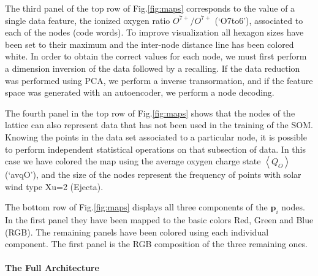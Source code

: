 The third panel of the top row of Fig.\ref{fig:maps} corresponds to the value of a single data feature, the ionized oxygen ratio $O^{7+}/O^{7+}$ (`O7to6'), associated to each of the nodes (code words). To improve visualization all hexagon sizes have been set to their maximum and the inter-node distance line has been colored white. In order to obtain the correct values for each node, we must first perform a dimension inversion of the data followed by a recalling. If the data reduction was performed using PCA, we perform a inverse transormation, and if the feature space was generated with an autoencoder, we perform a node decoding.

The fourth panel in the top row of Fig.\ref{fig:maps} shows that the nodes of the lattice can also represent data that has not been used in the training of the SOM. Knowing the points in the data set associated to a particular node, it is possible to perform independent statistical operations on that subsection of data. In this case we have colored the map using the average oxygen charge state $\left<Q_{O}\right>$ (`avqO'), and the size of the nodes represent the frequency of points with solar wind type Xu=2 (Ejecta).

The bottom row of Fig.\ref{fig:maps} displays all three components of the $\boldsymbol{p}_i$ nodes. In the first panel they have been mapped to the basic colors Red, Green and Blue (RGB). The remaining panels have been colored using each individual component. The first panel is the RGB composition of the three remaining ones.

\paragraph{The Full Architecture}
